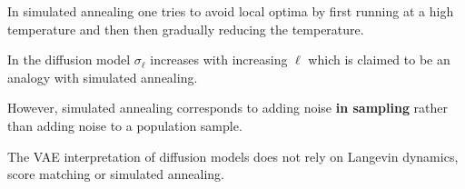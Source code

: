 {

In simulated annealing one tries to avoid local optima by first running at a high temperature and then then gradually reducing the temperature.

\vfill
In the diffusion model $\sigma_\ell$ increases with increasing $\ell$ which is claimed to be an analogy with simulated annealing.

\vfill
However, simulated annealing corresponds to adding noise {\bf in sampling} rather than adding noise to a population sample.

\vfill
The VAE interpretation of diffusion models does not rely on Langevin dynamics, score matching or simulated annealing.

}

